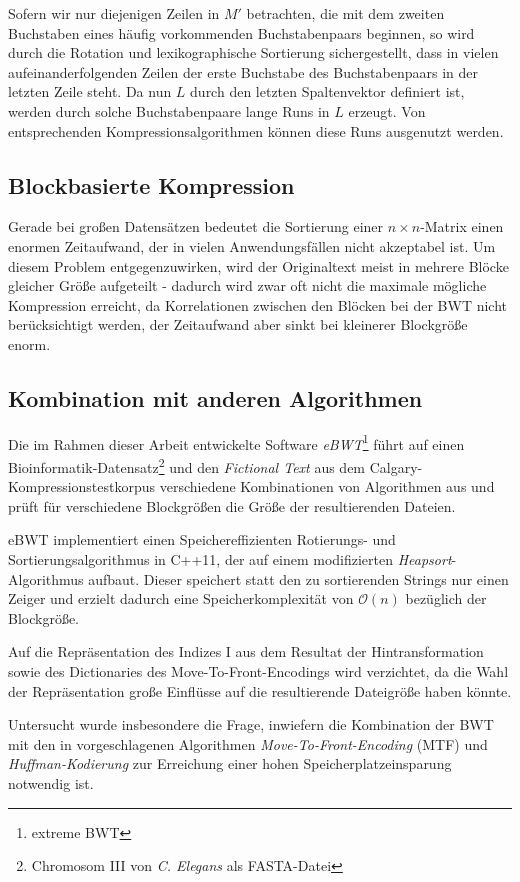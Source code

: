 \documentclass[ngerman,pdftex,paper=A4,DIV=calc,titlepage,12pt]{scrartcl}
\newtheorem[L]{boxedDefinition}{Definition}
\begin{document}
Sofern wir nur diejenigen Zeilen in $M'$ betrachten, die mit dem zweiten Buchstaben eines häufig vorkommenden Buchstabenpaars beginnen, so wird durch die Rotation und lexikographische Sortierung sichergestellt, dass    in vielen aufeinanderfolgenden Zeilen der erste Buchstabe des Buchstabenpaars in der letzten Zeile steht. Da nun $L$ durch den letzten Spaltenvektor definiert ist, werden durch solche Buchstabenpaare lange Runs in $L$ erzeugt. Von entsprechenden Kompressionsalgorithmen können diese Runs ausgenutzt werden.

\subsection{Blockbasierte Kompression}
Gerade bei großen Datensätzen bedeutet die Sortierung einer $n \times n$-Matrix einen enormen Zeitaufwand, der in vielen Anwendungsfällen nicht akzeptabel ist. Um diesem Problem entgegenzuwirken, wird der Originaltext meist in mehrere Blöcke gleicher Größe aufgeteilt - dadurch wird zwar oft nicht die maximale mögliche Kompression erreicht, da Korrelationen zwischen den Blöcken bei der BWT nicht berücksichtigt werden, der Zeitaufwand aber sinkt bei kleinerer Blockgröße enorm.

\subsection{Kombination mit anderen Algorithmen}
Die im Rahmen dieser Arbeit entwickelte Software \textit{eBWT}\footnote{extreme BWT} führt auf einen Bioinformatik-Datensatz\footnote{Chromosom III von \textit{C. Elegans} als FASTA-Datei} und den \textit{Fictional Text} aus dem Calgary-Kompressionstestkorpus verschiedene Kombinationen von Algorithmen aus und prüft für verschiedene Blockgrößen die Größe der resultierenden Dateien.

eBWT implementiert einen Speichereffizienten Rotierungs- und Sortierungsalgorithmus in C++11, der auf einem modifizierten \textit{Heapsort}-Algorithmus aufbaut. Dieser speichert statt den zu sortierenden Strings nur einen Zeiger und erzielt dadurch eine Speicherkomplexität von $\mathcal{O}(n)$ bezüglich der Blockgröße.

Auf die Repräsentation des Indizes I aus dem Resultat der Hintransformation sowie des Dictionaries des Move-To-Front-Encodings wird verzichtet, da die Wahl der Repräsentation große Einflüsse auf die resultierende Dateigröße haben könnte.

Untersucht wurde insbesondere die Frage, inwiefern die Kombination der BWT mit den in \cite{burrows1994block} vorgeschlagenen Algorithmen \textit{Move-To-Front-Encoding} (MTF) und \textit{Huffman-Kodierung} zur Erreichung einer hohen Speicherplatzeinsparung notwendig ist.
\end{document}
